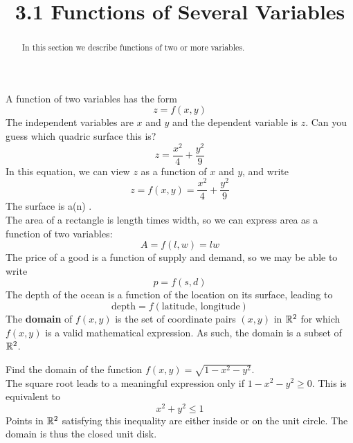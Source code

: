 \documentclass[handout]{ximera}
\title{3.1 Functions of Several Variables}
\begin{document}
\begin{abstract}
In this section we describe functions of two or more variables.
\end{abstract}

\maketitle

A function of two variables has the form
\[
z = f(x, y)
\]
The independent variables are $x$ and $y$ and the dependent variable is $z$. 
Can you guess which quadric surface this is? 
\[
z = \frac{x^2}{4} + \frac{y^2}{9}
\]
In this equation, we can view $z$ as a function of $x$ and $y$, and write
\[
z = f(x, y) = \frac{x^2}{4} + \frac{y^2}{9}
\]
The surface is a(n) .\\
The area of a rectangle is length times width, so we can express area 
as a function of two variables:
\[
A = f(l, w) = lw
\]
The price of a good is a function of supply and demand, so we may be able to write
\[
p = f(s, d)
\]
The depth of the ocean is a function of the location on its surface, leading to
\[
\mbox{depth} = f(\mbox{latitude, longitude})
\]
The \textbf{domain} of $f(x, y)$ is the set of coordinate pairs $(x, y)$ in $\mathbb R^2$ for 
which $f(x, y)$ is a valid mathematical expression. 
As such, the domain is a subset of $\mathbb R^2$.

\begin{example}[Example 1]
Find the domain of the function $f(x, y) = \sqrt{1 - x^2 - y^2}$.\\
The square root leads to a meaningful expression only if $1 - x^2 - y^2 \geq 0$. 
This is equivalent to 
\[
x^2 + y^2 \leq 1
\]
Points in $\mathbb R^2$ satisfying this inequality are either inside or on the unit circle.
The domain is thus the closed unit disk.

\begin{image}
\end{image}


\end{example}
\end{document}
